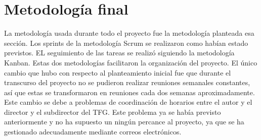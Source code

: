 \section{Metodología final}

La metodología usada durante todo el proyecto fue la metodología planteada esa sección. Los sprints de la metodología Scrum se realizaron como habían estado previstos. EL seguimiento de las tareas se realizó siguiendo la metodología Kanban. Estas dos metodologías facilitaron la organización del proyecto. El único cambio que hubo con respecto al planteamiento inicial fue que durante el transcurso del proyecto no se pudieron realizar reuniones semanales constantes, así que estas se transformaron en reuniones cada dos semanas aproximadamente. Este cambio se debe a problemas de coordinación de horarios entre el autor y el director y el subdirector del TFG. Este problema ya se había previsto anteriormente y no ha supuesto un ningún percance al proyecto, ya que se ha gestionado adecuadamente mediante correos electrónicos. 
